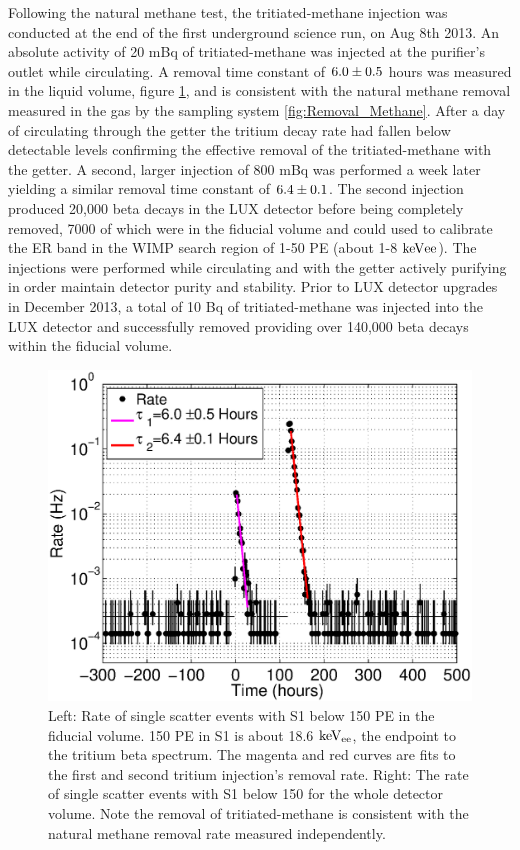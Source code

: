 Following the natural methane test, the tritiated-methane injection was conducted at the end of the first underground science run, on Aug 8th 2013. An absolute activity of 20 mBq of tritiated-methane was injected at the purifier's outlet while circulating. A removal time constant of $\rm 6.0 \pm 0.5$ hours was measured in the liquid volume, figure \ref{fig:Removal}, and is consistent with the natural methane removal measured in the gas by the sampling system \ref{fig:Removal_Methane}. After a day of circulating through the getter the tritium decay rate had fallen below detectable levels confirming the effective removal of the tritiated-methane with the getter. A second, larger injection of 800 mBq was performed a week later yielding a similar removal time constant of $\rm 6.4 \pm 0.1$. The second injection produced 20,000 beta decays in the LUX detector before being completely removed, 7000 of which were in the fiducial volume and could used to calibrate the ER band in the WIMP search region of 1-50 PE (about 1-8 $\rm keV{ee}$). The injections were performed while circulating and with the getter actively purifying in order maintain detector purity and stability. Prior to LUX detector upgrades in December 2013, a total of 10 Bq of tritiated-methane was injected into the LUX detector and successfully removed providing over 140,000 beta decays within the fiducial volume. 

\renewcommand{\baselinestretch}{1}
\small\normalsize
\begin{figure}[h!]\centering
\includegraphics[width=120mm]{Chapter_T/Figures/CH3T_Rate_fid_150_Run03_Tritium_Rate.eps}
\caption{Left: Rate of single scatter events with S1 below 150 PE in the fiducial volume. 150 PE in S1 is about 18.6 $\rm keV_{ee}$, the endpoint to the tritium beta spectrum. The magenta and red curves are fits to the first and second tritium injection's removal rate. Right: The rate of single scatter events with S1 below 150 for the whole detector volume. Note the removal of tritiated-methane is consistent with the natural methane removal rate measured independently.}
\label{fig:Removal}
\end{figure}
\renewcommand{\baselinestretch}{2}
\small\normalsize




